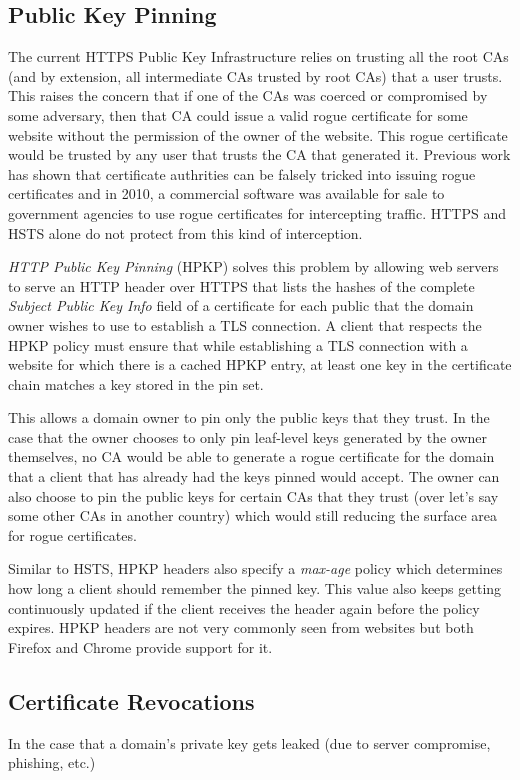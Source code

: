 \subsection{Public Key Pinning}
The current HTTPS Public Key Infrastructure relies on trusting all the root CAs
(and by extension, all intermediate CAs trusted by root CAs) that a user
trusts. This raises the concern that if one of the CAs was coerced or
compromised by some adversary, then that CA could issue a valid rogue
certificate for some website without the permission of the owner of the
website. This rogue certificate would be trusted by any user that trusts the CA
that generated it. Previous work has shown that certificate authrities can be
falsely tricked into issuing rogue certificates and in 2010, a commercial
software was available for sale to government agencies to use rogue
certificates for intercepting traffic. HTTPS and HSTS alone do not protect from
this kind of interception.

\emph{HTTP Public Key Pinning} (HPKP) solves this problem by allowing web
servers to serve an HTTP header over HTTPS that lists the hashes of the
complete \emph{Subject Public Key Info} field of a certificate for each public
that the domain owner wishes to use to establish a TLS connection. A client
that respects the HPKP policy must ensure that while establishing a TLS
connection with a website for which there is a cached HPKP entry, at least one
key in the certificate chain matches a key stored in the pin set.

This allows a domain owner to pin only the public keys that they trust. In the
case that the owner chooses to only pin leaf-level keys generated by the owner
themselves, no CA would be able to generate a rogue certificate for the domain
that a client that has already had the keys pinned would accept. The owner can
also choose to pin the public keys for certain CAs that they trust (over let's
say some other CAs in another country) which would still reducing the surface
area for rogue certificates.

Similar to HSTS, HPKP headers also specify a \emph{max-age} policy which
determines how long a client should remember the pinned key. This value also
keeps getting continuously updated if the client receives the header again
before the policy expires. HPKP headers are not very commonly seen from
websites but both Firefox and Chrome provide support for it.


\subsection{Certificate Revocations}
In the case that a domain's private key gets leaked (due to server compromise,
phishing, etc.)


